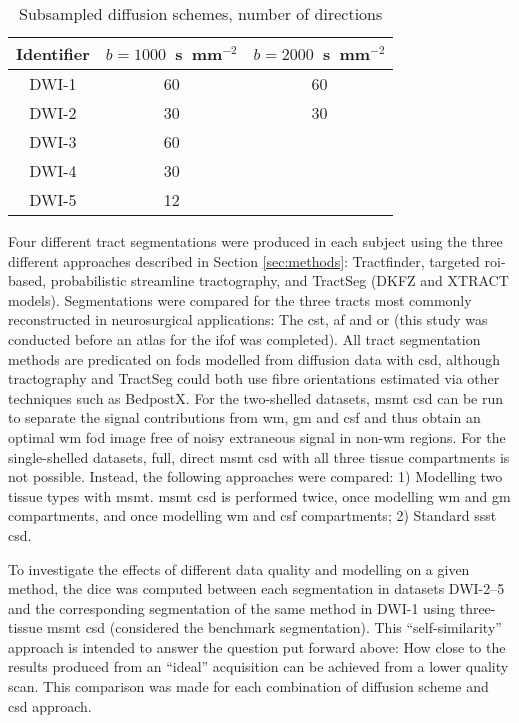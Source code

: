 \begin{table}
  \centering
  \begin{tabular}{c c c} \toprule
    Identifier & $b=1000$~s~mm$^{-2}$ & $b=2000$~s~mm$^{-2}$ \\
    \midrule
    DWI-1 & 60 & 60 \\
    DWI-2 & 30 & 30 \\
    DWI-3 & 60 &    \\
    DWI-4 & 30 &    \\
    DWI-5 & 12 &    \\ \bottomrule
  \end{tabular}
  \caption[Subsampled diffusion schemes for data stability analysis]{Subsampled diffusion schemes, number of directions}
  \label{tab:subschemes}
\end{table}

Four different tract segmentations were produced in each subject using the three different approaches described in Section \ref{sec:methods}: Tractfinder, targeted \gls{roi}-based, probabilistic streamline tractography, and TractSeg (DKFZ and XTRACT models).
Segmentations were compared for the three tracts most commonly reconstructed in neurosurgical applications:
The \gls{cst}, \gls{af} and \gls{or} (this study was conducted before an atlas for the \gls{ifof} was completed).
All tract segmentation methods are predicated on \glspl{fod} modelled from diffusion data with \gls{csd}, although tractography and TractSeg could both use fibre orientations estimated via other techniques such as BedpostX\autocite{Behrens2007}.
For the two-shelled datasets, \gls{msmt} \gls{csd} can be run to separate the signal contributions from \gls{wm}, \gls{gm} and \gls{csf} and thus obtain an optimal \gls{wm} \gls{fod} image free of noisy extraneous signal in non-\gls{wm} regions.
For the single-shelled datasets, full, direct \gls{msmt} \gls{csd} with all three tissue compartments is not possible.
Instead, the following approaches were compared: 1) Modelling two tissue types with \gls{msmt}.
\Gls{msmt} \gls{csd} is performed twice, once modelling \gls{wm} and \gls{gm} compartments, and once modelling \gls{wm} and \gls{csf} compartments; 2) Standard \gls{ssst} \gls{csd}.

To investigate the effects of different data quality and modelling on a given method, the \gls{dice} \autocite{Dice1945} was computed between each segmentation in datasets DWI-2--5 and the corresponding segmentation of the same method in DWI-1 using three-tissue \gls{msmt} \gls{csd} (considered the benchmark segmentation).
This ``self-similarity'' approach is intended to answer the question put forward above:
How close to the results produced from an ``ideal'' acquisition can be achieved from a lower quality scan.
This comparison was made for each combination of diffusion scheme and \gls{csd} approach.

